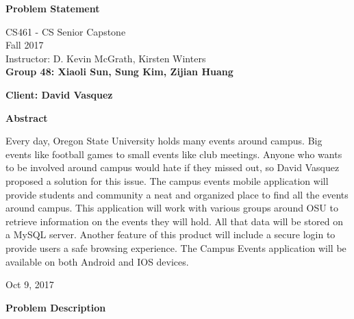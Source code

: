 \documentclass[10pt,letterpaper]{article}
\begin{document}
\begin{titlepage}
\begin{center}
    \Huge
    \textbf{Problem Statement}
    
    \vspace{0.5in}
    \large
    CS461 - CS Senior Capstone\\
    
    \vspace{0.2in}
    \large
    Fall 2017\\
    
    \vspace{0.2in}
    \large
    Instructor: D. Kevin McGrath, Kirsten Winters\\
    
    \vspace{0.2in}
    \textbf{Group 48: Xiaoli Sun, Sung Kim, Zijian Huang}
    
    \vspace{0.2in}
    \textbf{Client: David Vasquez}
    
    \vspace{0.5in}
    \textbf{Abstract}\\
    \vspace{0.2in}
    
    Every day, Oregon State University holds many events around campus. Big events like football games to small events like club meetings. Anyone who wants to be involved around campus would hate if they missed out, so David Vasquez proposed a solution for this issue. The campus events mobile application will provide students and community a neat and organized place to find all the events around campus. This application will work with various groups around OSU to retrieve information on the events they will hold. All that data will be stored on a MySQL server. Another feature of this product will include a secure login to provide users a safe browsing experience. The Campus Events application will be available on both Android and IOS devices.
    
    \vspace{0.3in}
    \vfill
    
    Oct 9, 2017

\end{center}
\end{titlepage}

\newpage

\begin{center}
\large
\textbf{Problem Description}
\end{center}
\end{document}
